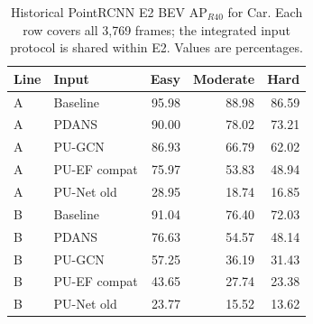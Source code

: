 \begin{table}[!t]\centering\setlength{\tabcolsep}{5pt}
\begin{tabular}{llrrr}\toprule
Line & Input & Easy & Moderate & Hard\\\midrule

A & Baseline & 95.98 & 88.98 & 86.59\\

A & PDANS & 90.00 & 78.02 & 73.21\\

A & PU-GCN & 86.93 & 66.79 & 62.02\\

A & PU-EF compat & 75.97 & 53.83 & 48.94\\

A & PU-Net old & 28.95 & 18.74 & 16.85\\

\midrule

B & Baseline & 91.04 & 76.40 & 72.03\\

B & PDANS & 76.63 & 54.57 & 48.14\\

B & PU-GCN & 57.25 & 36.19 & 31.43\\

B & PU-EF compat & 43.65 & 27.74 & 23.38\\

B & PU-Net old & 23.77 & 15.52 & 13.62\\

\bottomrule\end{tabular}
\caption{Historical PointRCNN E2 BEV AP$_{R40}$ for Car. Each row covers all 3,769 frames; the integrated input protocol is shared within E2. Values are percentages.}\label{tab:k-e2-bev}\end{table}

